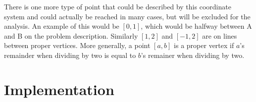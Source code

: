 \documentclass{article}
\begin{document}
\par

There is one more type of point that could be described by this coordinate system and could actually be reached in many cases, but will be excluded for the analysis.  An example of this would be $[0, 1]$, which would be halfway between A and B on the problem description.  Similarly $[1, 2]$ and $[-1, 2]$ are on lines between proper vertices.  More generally, a point $[a, b]$ is a proper vertex if $a$'s remainder when dividing by two is equal to $b$'s remainer when dividing by two.

\section*{Implementation}



\end{document}
